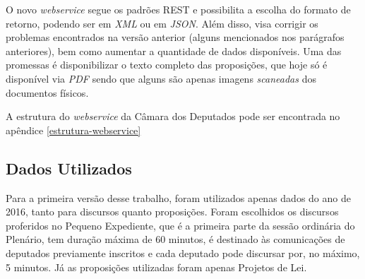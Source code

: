 O novo \textit{webservice} segue os padrões REST e possibilita a escolha do formato de retorno, podendo ser em \textit{XML} ou em  \textit{JSON}. Além disso, visa corrigir os problemas encontrados na versão anterior (alguns mencionados nos parágrafos anteriores), bem como aumentar a quantidade de dados disponíveis. Uma das promessas é disponibilizar o texto completo das proposições, que hoje só é disponível via \textit{PDF} sendo que alguns são apenas imagens \textit{scaneadas} dos documentos físicos.

A estrutura do \textit{webservice} da Câmara dos Deputados pode ser encontrada no apêndice \ref{estrutura-webservice}

\subsection{Dados Utilizados}

Para a primeira versão desse trabalho, foram utilizados apenas dados do ano de 2016, tanto para discursos quanto proposições. Foram escolhidos os discursos proferidos no Pequeno Expediente, que é a primeira parte da sessão ordinária do Plenário, tem duração máxima de 60 minutos, é destinado às comunicações de deputados previamente inscritos e cada deputado pode discursar por, no máximo, 5 minutos. Já as proposições utilizadas foram apenas Projetos de Lei.
